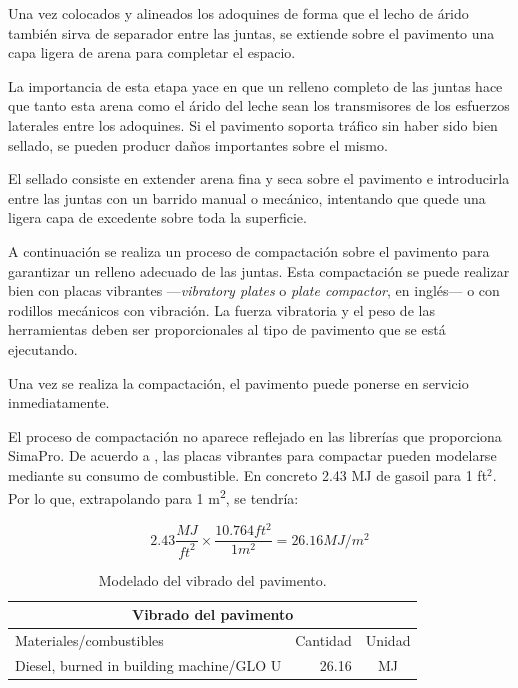 Una vez colocados y alineados los adoquines de forma que el lecho de árido también sirva de separador entre las juntas, se extiende sobre el pavimento una capa ligera de arena para completar el espacio.

La importancia de esta etapa yace en que un relleno completo de las juntas hace que tanto esta arena como el árido del leche sean los transmisores de los esfuerzos laterales entre los adoquines. Si el pavimento soporta tráfico sin haber sido bien sellado, se pueden producr daños importantes sobre el mismo.

El sellado consiste en extender arena fina y seca sobre el pavimento e introducirla entre las juntas con un barrido manual o mecánico, intentando que quede una ligera capa de excedente sobre toda la superficie.

A continuación se realiza un proceso de compactación sobre el pavimento para garantizar un relleno adecuado de las juntas. Esta compactación se puede realizar bien con placas vibrantes —\textit{vibratory plates} o \textit{plate compactor}, en inglés— o con rodillos mecánicos con vibración. La fuerza vibratoria y el peso de las herramientas deben ser proporcionales al tipo de pavimento que se está ejecutando.

Una vez se realiza la compactación, el pavimento puede ponerse en servicio inmediatamente.

El proceso de compactación no aparece reflejado en las librerías que proporciona SimaPro. De acuerdo a \cite{rieradevall}, las placas vibrantes para compactar pueden modelarse mediante su consumo de combustible. En concreto 2.43 \si{MJ} de gasoil para 1 ft$^2$. Por lo que, extrapolando para 1 \si{m^2}, se tendría:

\begin{equation}
2.43\frac{MJ}{{ft}^2} \times \frac{10.764{ft^2}}{1m^2}=26.16MJ/m^2
\end{equation}

\begin{table}[!htb]
\centering
\begin{tabular}{p{8cm}rc}
\toprule
\multicolumn{3}{c}{Vibrado del pavimento}\\
\midrule
Materiales/combustibles & Cantidad & Unidad\\
\midrule
Diesel, burned in building machine/GLO U & 26.16 & \si{MJ}\\
\bottomrule
\end{tabular}
\caption{Modelado del vibrado del pavimento.}
\label{modeladovibrado}
\end{table}


